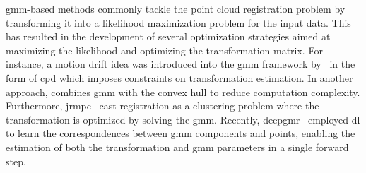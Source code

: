 
\gls{gmm}-based methods commonly tackle the point cloud registration problem by transforming it into a likelihood maximization problem for the input data. This has resulted in the development of several optimization strategies aimed at maximizing the likelihood and optimizing the transformation matrix. For instance, a motion drift idea was introduced into the \gls{gmm} framework by~\cite{information-retrieval-for-music-and-motion} in the form of \gls{cpd} which imposes constraints on transformation estimation. In another approach,\cite{convex-hull-indexed-gaussian-mixture-model-ch-gmm-for-3d-point-set-registration} combines \gls{gmm} with the convex hull to reduce computation complexity. Furthermore, \gls{jrmpc}~\cite{a-generative-model-for-the-joint-registration-of-multiple-point-sets} cast registration as a clustering problem where the transformation is optimized by solving the \gls{gmm}. Recently, \gls{deepgmr}~\cite{deepgmr:-learning-latent-gaussian-mixture-models-for-registration} employed \gls{dl} to learn the correspondences between \gls{gmm} components and points, enabling the estimation of both the transformation and \gls{gmm} parameters in a single forward step. \medskip

